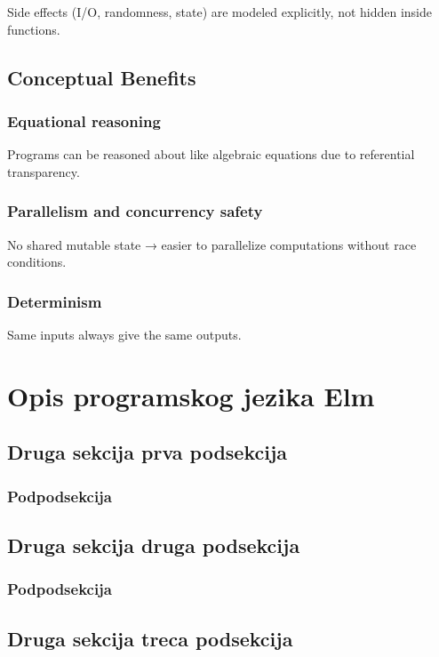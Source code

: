 \documentclass{viser-thesis}
\begin{document}
Side effects (I/O, randomness, state) are modeled explicitly, not hidden inside functions.

\newpage

\subsection{Conceptual Benefits}

\subsubsection{Equational reasoning}

Programs can be reasoned about like algebraic equations due to referential transparency.

\subsubsection{Parallelism and concurrency safety}

No shared mutable state → easier to parallelize computations without race conditions.

\subsubsection{Determinism}

Same inputs always give the same outputs.

\newpage

\section{Opis programskog jezika Elm}
\newpage
\subsection{Druga sekcija prva podsekcija}
\newpage
\subsubsection{Podpodsekcija}
\newpage
\subsection{Druga sekcija druga podsekcija}
\newpage
\subsubsection{Podpodsekcija}
\newpage
\subsection{Druga sekcija treca podsekcija}
\newpage
\end{document}

